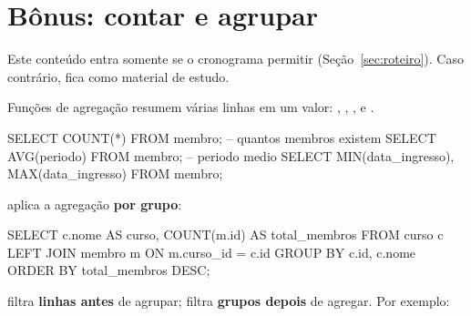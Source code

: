 \section{Bônus: contar e agrupar}
\label{sec:agregacao}

\begin{dica}
Este conteúdo entra somente se o cronograma permitir
(Seção~\ref{sec:roteiro}). Caso contrário, fica como material de estudo.
\end{dica}

Funções de agregação resumem várias linhas em um valor: ,
, ,  e .

\begin{sqlcode}
SELECT COUNT(*) FROM membro;      -- quantos membros existem
SELECT AVG(periodo) FROM membro;  -- periodo medio
SELECT MIN(data_ingresso), MAX(data_ingresso) FROM membro;
\end{sqlcode}

 aplica a agregação \textbf{por grupo}:

\begin{sqlcode}
SELECT c.nome        AS curso,
       COUNT(m.id)   AS total_membros
FROM   curso c
LEFT   JOIN membro m ON m.curso_id = c.id
GROUP  BY c.id, c.nome
ORDER  BY total_membros DESC;
\end{sqlcode}

\begin{conceito}
 filtra \textbf{linhas antes} de agrupar; 
filtra \textbf{grupos depois} de agregar. Por exemplo:
\end{conceito}
